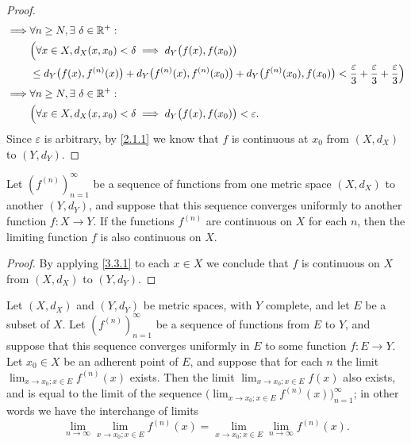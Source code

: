 \begin{proof}
\begin{align*}
    \implies & \forall n \geq N, \exists\ \delta \in \mathbb{R}^+ :                                                                                                                                                   \\
             & \Big(\forall x \in X, d_X(x, x_0) < \delta \implies d_Y\big(f(x), f(x_0)\big)                                                                                                                  \\
             & \leq d_Y\big(f(x), f^{(n)}(x)\big) + d_Y\big(f^{(n)}(x), f^{(n)}(x_0)\big) + d_Y\big(f^{(n)}(x_0), f(x_0)\big) < \dfrac{\varepsilon}{3} + \dfrac{\varepsilon}{3} + \dfrac{\varepsilon}{3}\Big) \\
    \implies & \forall n \geq N, \exists\ \delta \in \mathbb{R}^+ :                                                                                                                                                   \\
             & \Big(\forall x \in X, d_X(x, x_0) < \delta \implies d_Y\big(f(x), f(x_0)\big) < \varepsilon.
  \end{align*}
  Since \(\varepsilon\) is arbitrary, by \cref{2.1.1} we know that \(f\) is continuous at \(x_0\) from \((X, d_X)\) to \((Y, d_Y)\).
\end{proof}

\begin{cor}\label{3.3.2}
  Let \((f^{(n)})_{n = 1}^\infty\) be a sequence of functions from one metric space \((X, d_X)\) to another \((Y, d_Y)\), and suppose that this sequence converges uniformly to another function \(f : X \to Y\).
  If the functions \(f^{(n)}\) are continuous on \(X\) for each \(n\), then the limiting function \(f\) is also continuous on \(X\).
\end{cor}

\begin{proof}
  By applying \cref{3.3.1} to each \(x \in X\) we conclude that \(f\) is continuous on \(X\) from \((X, d_X)\) to \((Y, d_Y)\).
\end{proof}

\begin{prop}\label{3.3.3}
  Let
  \((X, d_X)\) and \((Y, d_Y)\) be metric spaces, with \(Y\) complete, and let \(E\) be a subset of \(X\).
  Let \((f^{(n)})_{n = 1}^\infty\) be a sequence of functions from \(E\) to \(Y\), and suppose that this sequence converges uniformly in \(E\) to some function \(f : E \to Y\).
  Let \(x_0 \in X\) be an adherent point of \(E\), and suppose that for each \(n\) the limit \(\lim_{x \to x_0 ; x \in E} f^{(n)}(x)\) exists.
  Then the limit \(\lim_{x \to x_0 ; x \in E} f(x)\) also exists, and is equal to the limit of the sequence \(\big(\lim_{x \to x_0 ; x \in E} f^{(n)}(x)\big)_{n = 1}^\infty\);
  in other words we have the interchange of limits
  \[
    \lim_{n \to \infty} \lim_{x \to x_0 ; x \in E} f^{(n)}(x) = \lim_{x \to x_0 ; x \in E} \lim_{n \to \infty} f^{(n)}(x).
  \]
\end{prop}

